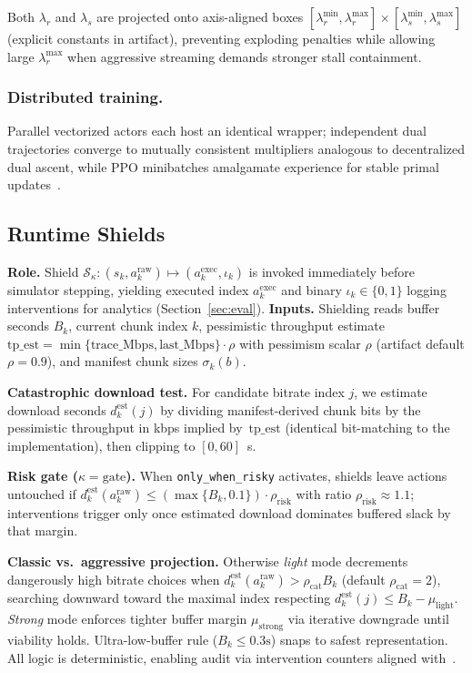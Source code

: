 \documentclass[preprint,12pt]{elsarticle}
\begin{document}
Both \(\lambda_r\) and \(\lambda_s\) are projected onto axis-aligned boxes \([\lambda^{\min}_{r},\lambda^{\max}_{r}] \times [\lambda^{\min}_{s},\lambda^{\max}_{s}]\) (explicit constants in artifact), preventing exploding penalties while allowing large \(\lambda^{\max}_{r}\) when aggressive streaming demands stronger stall containment.

\subsubsection{Distributed training.}
Parallel vectorized actors each host an identical wrapper; independent dual trajectories converge to mutually consistent multipliers analogous to decentralized dual ascent, while PPO minibatches amalgamate experience for stable primal updates~\cite{paternain2019dual}.

\subsection{Runtime Shields}\label{sec:method:shield}

\textbf{Role.}
Shield \(\mathcal{S}_{\kappa}:(s_k,a^{\mathrm{raw}}_k)\mapsto(a^{\mathrm{exec}}_k,\iota_k)\) is invoked immediately before simulator stepping, yielding executed index \(a^{\mathrm{exec}}_k\) and binary \(\iota_k\in\{0,1\}\) logging interventions for analytics (Section~\ref{sec:eval}).
\textbf{Inputs.}
Shielding reads buffer seconds \(B_k\), current chunk index \(k\), pessimistic throughput estimate \(\mathrm{tp\_est}=\min\{\mathrm{trace\_Mbps},\mathrm{last\_Mbps}\}\cdot\rho\) with pessimism scalar \(\rho\) (artifact default \(\rho{=}0.9\)), and manifest chunk sizes \(\sigma_{k}(b)\).

\textbf{Catastrophic download test.}
For candidate bitrate index \(j\), we estimate download seconds \(d^{\mathrm{est}}_{k}(j)\) by dividing manifest-derived chunk bits by the pessimistic throughput in kbps implied by~\(\mathrm{tp\_est}\) (identical bit-matching to the implementation), then clipping to \([0,60]\)~s.

\textbf{Risk gate (\(\kappa{=}\mathrm{gate}\)).}
When \texttt{only\_when\_risky} activates, shields leave actions untouched if \(d^{\mathrm{est}}_{k}(a^{\mathrm{raw}}_k)\le (\max\{B_k,0.1\})\cdot\rho_{\mathrm{risk}}\) with ratio \(\rho_{\mathrm{risk}}{\approx}1.1\); interventions trigger only once estimated download dominates buffered slack by that margin.

\textbf{Classic vs.\ aggressive projection.}
Otherwise \textit{light} mode decrements dangerously high bitrate choices when \(d^{\mathrm{est}}_{k}(a^{\mathrm{raw}}_k) > \rho_{\mathrm{cat}} B_k\) (default \(\rho_{\mathrm{cat}}{=}2\)), searching downward toward the maximal index respecting \(d^{\mathrm{est}}_{k}(j)\le B_k-\mu_{\mathrm{light}}\).
\textit{Strong} mode enforces tighter buffer margin \(\mu_{\mathrm{strong}}\) via iterative downgrade until viability holds.
Ultra-low-buffer rule (\(B_k\le 0.3\text{s}\)) snaps to safest representation.
All logic is deterministic, enabling audit via intervention counters aligned with~\cite{xiao2025qoe}.
\end{document}
